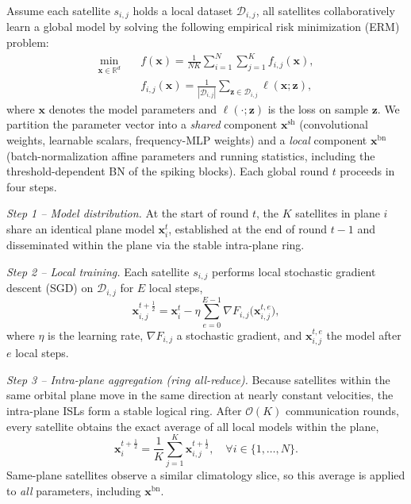\documentclass[conference]{IEEEtran}
\begin{document}
Assume each satellite $s_{i,j}$ holds a local dataset $\mathcal{D}_{i,j}$, all satellites collaboratively learn a global model by solving the following empirical risk minimization (ERM) problem:
\begin{equation*}
\begin{aligned}
\min_{\mathbf{x} \in \mathbb{R}^d} \quad & f(\mathbf{x}) = \frac{1}{NK} \sum_{i=1}^{N} \sum_{j=1}^{K} f_{i,j}(\mathbf{x}), \\
& f_{i,j}(\mathbf{x}) = \frac{1}{|\mathcal{D}_{i,j}|} \sum_{\mathbf{z} \in \mathcal{D}_{i,j}} \ell(\mathbf{x}; \mathbf{z}),
\end{aligned}
\end{equation*}
where $\mathbf{x}$ denotes the model parameters and
$\ell(\cdot;\mathbf{z})$ is the loss on sample $\mathbf{z}$. We
partition the parameter vector into a \emph{shared} component
$\mathbf{x}^{\mathrm{sh}}$ (convolutional weights, learnable scalars,
frequency-MLP weights) and a \emph{local} component
$\mathbf{x}^{\mathrm{bn}}$ (batch-normalization affine parameters and
running statistics, including the threshold-dependent BN of the
spiking blocks). Each global round $t$ proceeds in four steps.

\emph{Step 1 -- Model distribution.} At the start of round $t$, the
$K$ satellites in plane $i$ share an identical plane model
$\mathbf{x}_i^t$, established at the end of round $t-1$ and
disseminated within the plane via the stable intra-plane ring.

\emph{Step 2 -- Local training.} Each satellite $s_{i,j}$ performs
local stochastic gradient descent (SGD) on $\mathcal{D}_{i,j}$ for
$E$ local steps,
\begin{equation*}
\mathbf{x}_{i,j}^{t+\frac{1}{2}} = \mathbf{x}_i^t - \eta \sum_{e=0}^{E-1} \nabla F_{i,j}\bigl(\mathbf{x}_{i,j}^{t,e}\bigr),
\end{equation*}
where $\eta$ is the learning rate, $\nabla F_{i,j}$ a stochastic
gradient, and $\mathbf{x}_{i,j}^{t,e}$ the model after $e$ local
steps.

\emph{Step 3 -- Intra-plane aggregation (ring all-reduce).} Because
satellites within the same orbital plane move in the same direction
at nearly constant velocities, the intra-plane ISLs form a stable
logical ring. After $\mathcal{O}(K)$ communication rounds, every
satellite obtains the exact average of all local models within the
plane,
\begin{equation*}
\mathbf{x}_i^{t+\frac{1}{2}} = \frac{1}{K}\sum_{j=1}^{K} \mathbf{x}_{i,j}^{t+\frac{1}{2}}, \quad \forall i\in\{1,\dots,N\}.
\end{equation*}
Same-plane satellites observe a similar climatology slice, so this
average is applied to \emph{all} parameters, including
$\mathbf{x}^{\mathrm{bn}}$.
\end{document}

